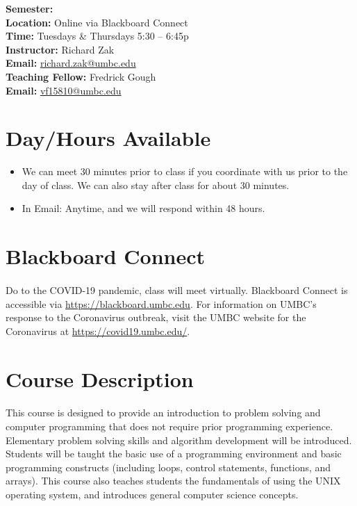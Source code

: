 \documentclass[letter,11pt]{article}
\begin{document}
\textbf{Semester:} \\
\textbf{Location:} Online via Blackboard Connect \\
\textbf{Time:} Tuesdays \& Thursdays 5:30 -- 6:45p \\
\textbf{Instructor:} Richard Zak \\
\textbf{Email:} \href{mailto:richard.zak@umbc.edu?Subject=CMSC104}{richard.zak@umbc.edu} \\
\textbf{Teaching Fellow:} Fredrick Gough \\
\textbf{Email:} \href{mailto:vf15810@umbc.edu?Subject=CMSC104}{vf15810@umbc.edu}

\section*{Day/Hours Available}
\begin{itemize}
\item We can meet 30 minutes prior to class if you coordinate with us prior to the day of class. We can also stay after class for about 30 minutes.
\item In Email: Anytime, and we will respond within 48 hours.
\end{itemize}

\section*{Blackboard Connect}
\paragraph{}Do to the COVID-19 pandemic, class will meet virtually. Blackboard Connect is accessible via \url{https://blackboard.umbc.edu}. For information on UMBC's response to the Coronavirus outbreak, visit the UMBC website for the Coronavirus at \url{https://covid19.umbc.edu/}.

\section*{Course Description}
\paragraph{}This course is designed to provide an introduction to problem solving and computer programming that does not require prior programming experience. Elementary problem solving skills and algorithm development will be introduced. Students will be taught the basic use of a programming environment and basic programming constructs (including loops, control statements, functions, and arrays). This course also teaches students the fundamentals of using the UNIX operating system, and introduces general computer science concepts.
\end{document}
